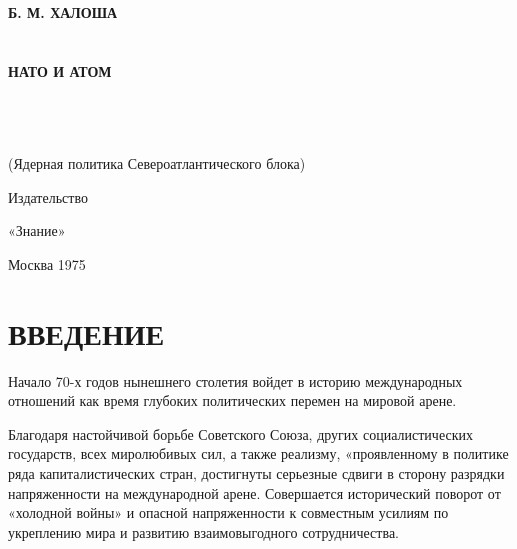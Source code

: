 \documentclass[12pt, a4paper, openany]{book}
\begin{document}
	
	\begin{titlepage}
		
		\begin{center}
			
			\vspace*{\fill}
			
			
			{\large\bf Б. М. ХАЛОША\\}
			\ \\
			\ \\
			{\fontsize{40}{48} \selectfont \textbf{НАТО И АТОМ}}
			
			\ \\
			\ \\
			\ \\
			(Ядерная политика Североатлантического блока) 
			\vspace*{\fill}
			
			\vfill
			
				\begin{flushright}
			
			Издательство
		
			«Знание»
		
			Москва 1975
			
		\end{flushright}
		\end{center}
		
	\end{titlepage}
	
	\thispagestyle{empty} %
	
	\newpage
	

\setcounter{secnumdepth}{0}
	
	\section[Введение]{\center ВВЕДЕНИЕ}
	
Начало 70-х годов нынешнего столетия войдет в историю международных отношений как время глубоких политических перемен на мировой арене.

Благодаря настойчивой борьбе Советского Союза, других социалистических государств, всех миролюбивых сил, а также реализму, «проявленному в политике ряда капиталистических стран, достигнуты серьезные сдвиги в сторону разрядки напряженности на международной арене. Совершается исторический поворот от «холодной войны» и опасной напряженности к совместным усилиям по укреплению мира и развитию взаимовыгодного сотрудничества.
\end{document}
